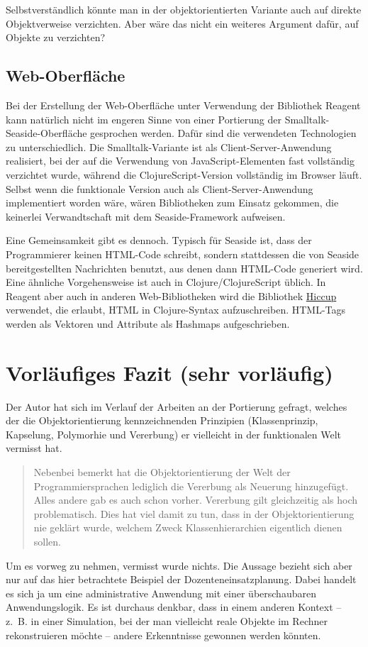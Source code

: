 \documentclass[11pt]{article}
\begin{document}
Selbstverständlich könnte man in der objektorientierten Variante auch
auf direkte Objektverweise verzichten. Aber wäre das nicht ein
weiteres Argument dafür, auf Objekte zu verzichten?

\subsection*{Web-Oberfläche}
\label{sec:orge76b0c0}
Bei der Erstellung der Web-Oberfläche unter Verwendung der Bibliothek
Reagent kann natürlich nicht im engeren Sinne von einer Portierung der
Smalltalk-Seaside-Oberfläche gesprochen werden. Dafür sind die
verwendeten Technologien zu unterschiedlich. Die
Smalltalk-Variante ist als Client-Server-Anwendung realisiert, bei der
auf die Verwendung von JavaScript-Elementen fast vollständig
verzichtet wurde, während die ClojureScript-Version vollständig
im Browser läuft. Selbst wenn die funktionale Version auch als
Client-Server-Anwendung implementiert worden wäre, wären Bibliotheken
zum Einsatz gekommen, die keinerlei Verwandtschaft mit dem
Seaside-Framework aufweisen. 

Eine Gemeinsamkeit gibt es dennoch. Typisch für Seaside ist, dass der
Programmierer keinen HTML-Code schreibt, sondern stattdessen die von
Seaside bereitgestellten Nachrichten benutzt, aus denen dann HTML-Code
generiert wird. Eine ähnliche Vorgehensweise ist auch in
Clojure/ClojureScript üblich. In Reagent aber auch in anderen
Web-Bibliotheken wird die Bibliothek \href{https://github.com/weavejester/hiccup}{Hiccup} verwendet, die erlaubt,
HTML in Clojure-Syntax aufzuschreiben. HTML-Tags werden als Vektoren
und Attribute als Hashmaps aufgeschrieben.

\section*{Vorläufiges Fazit (sehr vorläufig)}
\label{sec:org23a0823}
Der Autor hat sich im Verlauf der Arbeiten an der Portierung gefragt,
welches der die Objektorientierung kennzeichnenden Prinzipien
(Klassenprinzip, Kapselung, Polymorhie und Vererbung) er vielleicht in
der funktionalen Welt vermisst hat.
\begin{quote}
Nebenbei bemerkt hat die Objektorientierung der Welt der
Programmiersprachen lediglich die Vererbung als Neuerung
hinzugefügt. Alles andere gab es auch schon vorher. Vererbung gilt
gleichzeitig als hoch problematisch. Dies hat viel damit zu tun, dass
in der Objektorientierung nie geklärt wurde, welchem Zweck
Klassenhierarchien eigentlich dienen sollen.
\end{quote}
Um es vorweg zu nehmen, vermisst wurde nichts. Die Aussage bezieht
sich aber nur auf das hier betrachtete Beispiel der
Dozenteneinsatzplanung. Dabei handelt es sich ja um eine
administrative Anwendung mit einer überschaubaren Anwendungslogik. Es
ist durchaus denkbar, dass in einem anderen Kontext -- z.~B. in
einer Simulation, bei der man vielleicht reale Objekte im Rechner
rekonstruieren möchte -- andere Erkenntnisse gewonnen werden könnten.
\end{document}
